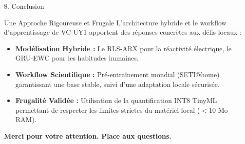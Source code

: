 \documentclass[10pt,aspectratio=169]{beamer}
\begin{document}
\begin{frame}{8. Conclusion}
  \begin{block}{Une Approche Rigoureuse et Frugale}
    L'architecture hybride et le workflow d'apprentissage de VC-UY1 apportent des réponses concrètes aux défis locaux :
    \begin{itemize}
      \item \textbf{Modélisation Hybride :} Le RLS-ARX pour la réactivité électrique, le GRU-EWC pour les habitudes humaines.
      \item \textbf{Workflow Scientifique :} Pré-entraînement mondial (SETI@home) garantissant une base stable, suivi d'une adaptation locale sécurisée.
      \item \textbf{Frugalité Validée :} Utilisation de la quantification INT8 TinyML permettant de respecter les limites strictes du matériel local ($< 10$ Mo RAM).
    \end{itemize}
  \end{block}
  
  \centering
  \vspace{1em}
  \Large\textbf{Merci pour votre attention. Place aux questions.}
\end{frame}
\end{document}
